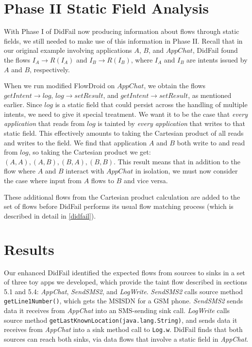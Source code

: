 \section{Phase II Static Field Analysis}
\label{sec:staticphase2}

With Phase I of DidFail now producing information about flows through static fields, we still needed to make use of this information in Phase II. Recall that in our original example involving applications $A$, $B$, and $AppChat$, DidFail found the flows $I_A\rightarrow R(I_A)$ and $I_B\rightarrow R(I_B)$, where $I_A$ and $I_B$ are intents issued by $A$ and $B$, respectively. 

When we run modified FlowDroid on $AppChat$, we obtain the flows $getIntent\rightarrow log$, $log\rightarrow setResult$, and $getIntent\rightarrow setResult$, as mentioned earlier. Since $log$ is a static field that could persist across the handling of multiple intents, we need to give it special treatment. We want it to be the case that \emph{every application} that reads from $log$ is tainted by \emph{every application} that writes to that static field. This effectively amounts to taking the Cartesian product of all reads and writes to the field. We find that application $A$ and $B$ both write to and read from $log$, so taking the Cartesian product we get: $(A, A), (A, B), (B, A), (B, B)$. This result means that in addition to the flow where $A$ and $B$ interact with $AppChat$ in isolation, we must now consider the case where input from $A$ flows to $B$ and vice versa.

These additional flows from the Cartesian product calculation are added to the set of flows before DidFail performs its usual flow matching process (which is described in detail in \ref{didfail}). 

\section{Results}
Our enhanced DidFail identified the expected flows from sources to sinks in a set of three toy apps we developed, which provide the taint flow described in sections 5.1 and 5.4: \emph{AppChat}, \emph{SendSMS2}, and \emph{LogWrite}. \emph{SendSMS2} calls source method \texttt{getLine1Number()},  which gets the MSISDN for a GSM phone.  \emph{SendSMS2} sends data it receives from \emph{AppChat} into an SMS-sending sink call. \emph{LogWrite} calls source method \texttt{getLastKnownLocation(java.lang.String)}, and sends data it receives from \emph{AppChat} into a sink method call to \texttt{Log.w}. DidFail finds that both sources can reach both sinks, via  data flows that involve a static field in \emph{AppChat}. 

